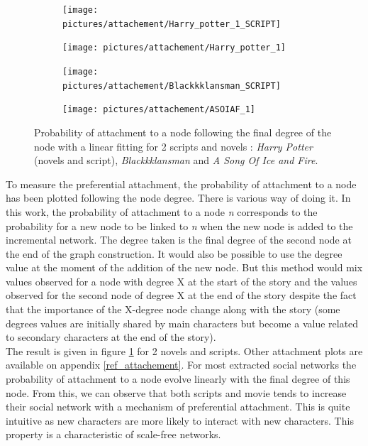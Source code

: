 \documentclass[a4paper, 12pt]{report}
\begin{document}
\begin{figure}
\begin{subfigure}{.49\textwidth}
\centering
\texttt{[image: pictures/attachement/Harry\_potter\_1\_SCRIPT]}
\end{subfigure}
\hfill
\begin{subfigure}{.49\textwidth}
\centering
\texttt{[image: pictures/attachement/Harry\_potter\_1]}
\end{subfigure}
\hfill
\begin{subfigure}{.49\textwidth}
\centering
\texttt{[image: pictures/attachement/Blackkklansman\_SCRIPT]}
\end{subfigure}
\hfill
\begin{subfigure}{.49\textwidth}
\texttt{[image: pictures/attachement/ASOIAF\_1]}
\end{subfigure}
\caption{Probability of attachment to a node following the final degree of the node with a linear fitting for 2 scripts and novels : \textit{Harry Potter} (novels and script), \textit{Blackkklansman} and \textit{A Song Of Ice and Fire}.}
\label{attachement}
\end{figure}

To measure the preferential attachment, the probability of attachment to a node has been plotted following the node degree. There is various way of doing it. In this work, the probability of attachment to a node \textit{n} corresponds to the probability for a new node to be linked to \textit{n} when the new node is added to the incremental network. The degree taken is the final degree of the second node at the end of the graph construction. It would also be possible to use the degree value at the moment of the addition of the new node. But this method would mix values observed for a node with degree X at the start of the story and the values observed for the second node of degree X at the end of the story despite the fact that the importance of the X-degree node change along with the story (some degrees values are initially shared by main characters but become a value related to secondary characters at the end of the story). \\

The result is given in figure \ref{attachement} for 2 novels and scripts. Other attachment plots are available on appendix \ref{ref_attachement}. For most extracted social networks the probability of attachment to a node evolve linearly with the final degree of this node. From this, we can observe that both scripts and movie tends to increase their social network with a mechanism of preferential attachment. This is quite intuitive as new characters are more likely to interact with new characters. This property is a characteristic of scale-free networks.
\end{document}
